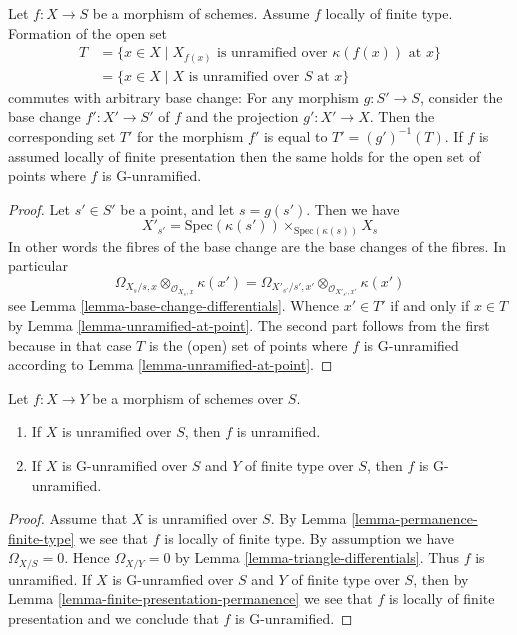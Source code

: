 \begin{lemma}
\label{lemma-set-points-where-fibres-unramified}
Let $f : X \to S$ be a morphism of schemes.
Assume $f$ locally of finite type. Formation of the open set
\begin{align*}
T
& =
\{x \in X \mid X_{f(x)}\text{ is unramified over }\kappa(f(x))\text{ at }x\} \\
& =
\{x \in X \mid X\text{ is unramified over }S\text{ at }x\}
\end{align*}
commutes with arbitrary base change:
For any morphism $g : S' \to S$, consider
the base change $f' : X' \to S'$ of $f$ and the
projection $g' : X' \to X$. Then the corresponding
set $T'$ for the morphism $f'$ is equal to $T' = (g')^{-1}(T)$.
If $f$ is assumed locally of finite presentation then the same holds
for the open set of points where $f$ is G-unramified.
\end{lemma}

\begin{proof}
Let $s' \in S'$ be a point, and let $s = g(s')$. Then we have
$$
X'_{s'} =
\text{Spec}(\kappa(s')) \times_{\text{Spec}(\kappa(s))} X_s
$$
In other words the fibres of the base change are the base changes
of the fibres. In particular
$$
\Omega_{X_s/s, x} \otimes_{\mathcal{O}_{X_s, x}} \kappa(x')
=
\Omega_{X'_{s'}/s', x'} \otimes_{\mathcal{O}_{X'_{s'}, x'}} \kappa(x')
$$
see
Lemma \ref{lemma-base-change-differentials}.
Whence $x' \in T'$ if and only if $x \in T$ by
Lemma \ref{lemma-unramified-at-point}.
The second part follows from the first because in that case
$T$ is the (open) set of points where $f$ is G-unramified according to
Lemma \ref{lemma-unramified-at-point}.
\end{proof}

\begin{lemma}
\label{lemma-unramified-permanence}
Let $f : X \to Y$ be a morphism of schemes over $S$.
\begin{enumerate}
\item If $X$ is unramified over $S$, then $f$ is unramified.
\item If $X$ is G-unramified over $S$ and $Y$ of finite type over $S$, then
$f$ is G-unramified.
\end{enumerate}
\end{lemma}

\begin{proof}
Assume that $X$ is unramified over $S$.
By Lemma \ref{lemma-permanence-finite-type} we see that $f$
is locally of finite type.
By assumption we have $\Omega_{X/S} = 0$. Hence
$\Omega_{X/Y} = 0$ by Lemma \ref{lemma-triangle-differentials}. Thus
$f$ is unramified. If $X$ is G-unramfied over $S$ and $Y$ of finite type
over $S$, then by
Lemma \ref{lemma-finite-presentation-permanence}
we see that $f$ is locally of finite presentation and we conclude
that $f$ is G-unramified.
\end{proof}

